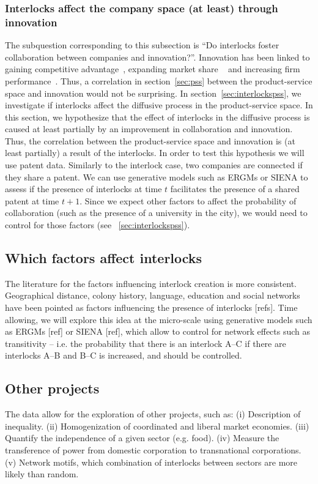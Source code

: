 \subsubsection{Interlocks affect the company space (at least) through innovation}
The subquestion corresponding to this subsection is ``Do interlocks foster collaboration between companies and innovation?''.
Innovation has been linked to gaining competitive advantage~\citep{Hitt1996}, expanding market share ~\citep{Franko1989} and increasing firm performance~\citep{Morbey1988}.
Thus, a correlation in section~\ref{sec:pss} between the product-service space and innovation would not be surprising. 
In section~\ref{sec:interlockspss}, we investigate if interlocks affect the diffusive process in the product-service space.
In this section, we hypothesize that the effect of interlocks in the diffusive process is caused at least partially by an improvement in collaboration and innovation.
Thus, the correlation between the product-service space and innovation is (at least partially) a result of the interlocks.
In order to test this hypothesis we will use patent data.
Similarly to the interlock case, two companies are connected if they share a patent.
We can use generative models such as ERGMs or SIENA to assess if the presence of interlocks at time $t$ facilitates the presence of a shared patent at time $t+1$. 
Since we expect other factors to affect the probability of collaboration (such as the presence of a university in the city),
we would need to control for those factors (see ~\ref{sec:interlockspss}).


\subsection{Which factors affect interlocks}
\label{sec:factors}
The literature for the factors influencing interlock creation is more consistent.
Geographical distance, colony history, language, education and social networks have been pointed as factors
influencing the presence of interlocks [refs].
Time allowing, we will explore this idea at the micro-scale using generative models such as ERGMs [ref] or SIENA [ref],
which allow to control for network effects such as transitivity -- i.e. the probability that there is an interlock A--C if there are interlocks A--B and B--C is increased, and should be controlled.


\subsection{Other projects}
The data allow for the exploration of other projects, such as:
(i) Description of inequality.
(ii) Homogenization of coordinated and liberal market economies.
(iii) Quantify the independence of a given sector (e.g. food).
(iv) Measure the transference of power from domestic corporation to transnational corporations.
(v) Network motifs, which combination of interlocks between sectors are more likely than random.


